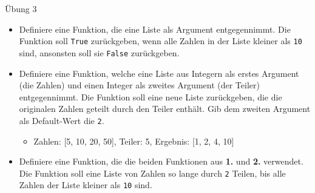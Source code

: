 \begin{frame}{Übung 3}
	\begin{itemize}
		\item[\textbf{1.}] Definiere eine Funktion, die eine Liste als Argument entgegennimmt. Die Funktion soll \alert{\texttt{True}} zurückgeben, wenn alle Zahlen in der Liste kleiner als \texttt{10} sind, ansonsten soll sie \alert{\texttt{False}} zurückgeben.
		\item[\textbf{2.}] Definiere eine Funktion, welche eine Liste aus Integern als erstes Argument (die Zahlen) und einen Integer als zweites Argument (der Teiler) entgegennimmt. Die Funktion soll eine neue Liste zurückgeben, die die originalen Zahlen geteilt durch den Teiler enthält. Gib dem zweiten Argument als Default-Wert die \texttt{2}.
		\begin{itemize}
			\item[\textbf{Bsp.:}] Zahlen: [5, 10, 20, 50], Teiler: 5, Ergebnis: [1, 2, 4, 10]
		\end{itemize}
		\item[\textbf{3.}] Definiere eine Funktion, die die beiden Funktionen aus \textbf{1.} und \textbf{2.} verwendet. Die Funktion soll eine Liste von Zahlen so lange durch \texttt{2} Teilen, bis alle Zahlen der Liste kleiner als \texttt{10} sind.
	\end{itemize}

\end{frame}


